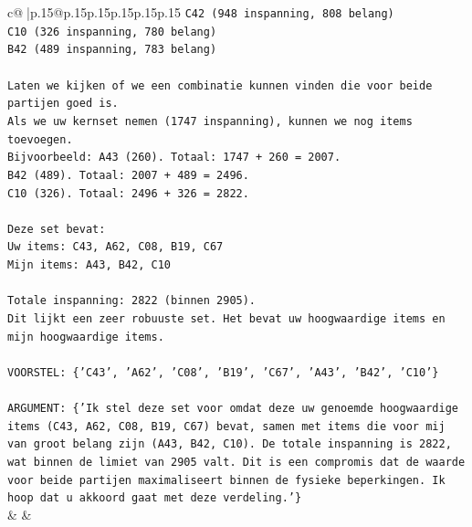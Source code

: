 \documentclass{article}
\begin{document}
{\begin{supertabular}{c@{$\;$}|p{.15\linewidth}@{}p{.15\linewidth}p{.15\linewidth}p{.15\linewidth}p{.15\linewidth}p{.15\linewidth}}
{{{\texttt{C42 (948 inspanning, 808 belang)} \\
\texttt{C10 (326 inspanning, 780 belang)} \\
\texttt{B42 (489 inspanning, 783 belang)} \\
\\ 
\texttt{Laten we kijken of we een combinatie kunnen vinden die voor beide partijen goed is.} \\
\texttt{Als we uw kernset nemen (1747 inspanning), kunnen we nog items toevoegen.} \\
\texttt{Bijvoorbeeld: A43 (260). Totaal: 1747 + 260 = 2007.} \\
\texttt{B42 (489). Totaal: 2007 + 489 = 2496.} \\
\texttt{C10 (326). Totaal: 2496 + 326 = 2822.} \\
\\ 
\texttt{Deze set bevat:} \\
\texttt{Uw items: C43, A62, C08, B19, C67} \\
\texttt{Mijn items: A43, B42, C10} \\
\\ 
\texttt{Totale inspanning: 2822 (binnen 2905).} \\
\texttt{Dit lijkt een zeer robuuste set. Het bevat uw hoogwaardige items en mijn hoogwaardige items.} \\
\\ 
\texttt{VOORSTEL: \{'C43', 'A62', 'C08', 'B19', 'C67', 'A43', 'B42', 'C10'\}} \\
\\ 
\texttt{ARGUMENT: \{'Ik stel deze set voor omdat deze uw genoemde hoogwaardige items (C43, A62, C08, B19, C67) bevat, samen met items die voor mij van groot belang zijn (A43, B42, C10). De totale inspanning is 2822, wat binnen de limiet van 2905 valt. Dit is een compromis dat de waarde voor beide partijen maximaliseert binnen de fysieke beperkingen. Ik hoop dat u akkoord gaat met deze verdeling.'\}} \\
            }
        }
    }
    & & \\ \\


\end{supertabular}}
\end{document}
